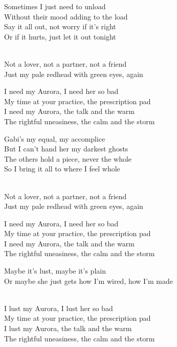 \begin{lyrics}
Sometimes I just need to unload\\
Without their mood adding to the load\\
Say it all out, not worry if it's right\\
Or if it hurts, just let it out tonight

\\
Not a lover, not a partner, not a friend\\
Just my pale redhead with green eyes, again

I need my Aurora, I need her so bad\\
My time at your practice, the prescription pad\\
I need my Aurora, the talk and the warm\\
The rightful uneasiness, the calm and the storm

Gabi's my equal, my accomplice\\
But I can't hand her my darkest ghosts\\
The others hold a piece, never the whole\\
So I bring it all to where I feel whole

\\
Not a lover, not a partner, not a friend\\
Just my pale redhead with green eyes, again

I need my Aurora, I need her so bad\\
My time at your practice, the prescription pad\\
I need my Aurora, the talk and the warm\\
The rightful uneasiness, the calm and the storm

Maybe it's lust, maybe it's plain\\
Or maybe she just gets how I'm wired, how I'm made

\\
I lust my Aurora, I lust her so bad\\
My time at your practice, the prescription pad\\
I lust my Aurora, the talk and the warm\\
The rightful uneasiness, the calm and the storm
\end{lyrics}

